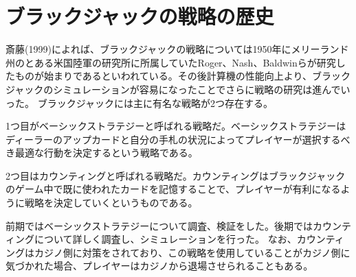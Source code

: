 
\section{ブラックジャックの戦略の歴史}
斎藤(1999)によれば、ブラックジャックの戦略については1950年にメリーランド州のとある米国陸軍の研究所に所属していたRoger、Nash、Baldwinらが研究したものが始まりであるといわれている。その後計算機の性能向上より、ブラックジャックのシミュレーションが容易になったことでさらに戦略の研究は進んでいった。
ブラックジャックには主に有名な戦略が2つ存在する。

1つ目がベーシックストラテジーと呼ばれる戦略だ。ベーシックストラテジーはディーラーのアップカードと自分の手札の状況によってプレイヤーが選択するべき最適な行動を決定するという戦略である。

2つ目はカウンティングと呼ばれる戦略だ。カウンティングはブラックジャックのゲーム中で既に使われたカードを記憶することで、プレイヤーが有利になるように戦略を決定していくというものである。

前期ではベーシックストラテジーについて調査、検証をした。後期ではカウンティングについて詳しく調査し、シミュレーションを行った。
なお、カウンティングはカジノ側に対策をされており、この戦略を使用していることがカジノ側に気づかれた場合、プレイヤーはカジノから退場させられることもある。
